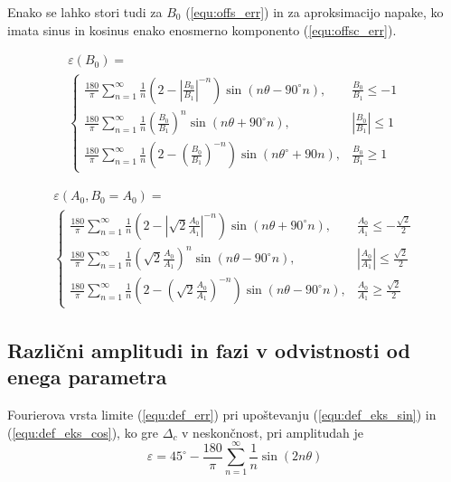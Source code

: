 \documentclass[a4paper]{article}
\begin{document}
Enako se lahko stori tudi za $B_0$ (\ref{equ:offs_err}) in za aproksimacijo napake, ko imata sinus in kosinus enako enosmerno komponento (\ref{equ:offsc_err}).

\begin{multline}
\label{equ:offs_err}
\varepsilon(B_0)=\\
\begin{cases}
\frac{180}{\pi}\sum_{n=1}^{\infty}\frac{1}{n}(2-|\frac{B_0}{B_1}|^{-n}) \sin (n \theta -  90^\circ n), & \frac{B_0}{B_1}\leq -1 \\
\frac{180}{\pi}\sum_{n=1}^{\infty}\frac{1}{n}(\frac{B_0}{B_1})^n \sin (n \theta + 90^\circ n), & |\frac{B_0}{B_1}|\leq 1 \\
\frac{180}{\pi}\sum_{n=1}^{\infty}\frac{1}{n}(2-(\frac{B_0}{B_1})^{-n}) \sin (n \theta^\circ + 90 n), & \frac{B_0}{B_1}\geq 1
\end{cases}
\end{multline}

\begin{multline}
\label{equ:offsc_err}
\varepsilon(A_0,B_0=A_0)=\\
\begin{cases}
\frac{180}{\pi}\sum_{n=1}^{\infty}\frac{1}{n}(2-|\sqrt{2}\frac{A_0}{A_1}|^{-n}) \sin (n \theta + 90^\circ n), & \frac{A_0}{A_1}\leq -\frac{\sqrt{2}}{2} \\
\frac{180}{\pi}\sum_{n=1}^{\infty}\frac{1}{n}(\sqrt{2}\frac{A_0}{A_1})^n \sin (n \theta - 90^\circ n), & |\frac{A_0}{A_1}|\leq \frac{\sqrt{2}}{2} \\
\frac{180}{\pi}\sum_{n=1}^{\infty}\frac{1}{n}(2-(\sqrt{2}\frac{A_0}{A_1})^{-n}) \sin (n \theta - 90^\circ n), & \frac{A_0}{A_1}\geq \frac{\sqrt{2}}{2}
\end{cases}
\end{multline}

\subsection{Različni amplitudi in fazi v odvistnosti od enega parametra}

Fourierova vrsta limite (\ref{equ:def_err}) pri upoštevanju (\ref{equ:def_eks_sin}) in (\ref{equ:def_eks_cos}), ko gre $\Delta_c$ v neskončnost, pri amplitudah je
\begin{equation}
\label{equ:lim_dc_vrsta}
\varepsilon = 45^\circ -\frac{180}{\pi}\sum_{n=1}^{\infty}\frac{1}{n} \sin( 2 n \theta)
\end{equation}
\end{document}
